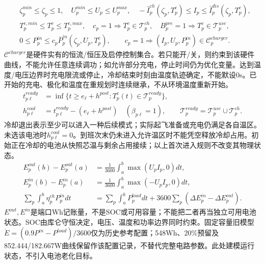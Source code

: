 \begin{align}
 &\zeta^{min}_p\le\zeta_p\le1,\quad U_p^{min}\le U_p\le U_p^{max},
 \quad-\bar I_p^{ch}(\zeta_p,T_p^c)\le I_p\le\bar I_p^{dis}(\zeta_p,T_p^c),\\
 &T_p^{c,min}\le T_p^c\le T_p^{c,max},\quad
 c_p=1\Rightarrow T_p^c\in\mathcal T_p^{ch},\quad
 B_p^{pre}=1\Rightarrow T_p^c\in\mathcal T_p^{use},\\
 &0\le P_p^{in}\le c_p\bar P_p^{in}(\zeta_p,U_p,T_p^c),\qquad
 c_p=1\Rightarrow (I_p,U_p,P_p^{in})\in\mathcal C_p^{charger}.
 \label{eng:eq:chargecurve}
\end{align}
\noindent $\mathcal C^{charger}$是硬件实有的恒流/恒压及启停控制集合。若只能开/关，则约束到该硬件曲线，不能允许任意连续调功；如允许部分充电，停止时间仍为优化变量。达到温度/电压边界时充电限流或停止，冷却结束时刻由温度轨迹确定，不能默设0s。已开始的充电、极化和温度在重规划时连续继承，不从环境温度重新开始。
\begin{align}
 t_{p\ell}^{ready}&=\inf\{t\ge e_\ell+h^{post}:T_p^c(t)\in\mathcal T_p^{ready}\},\\
 h_{p\ell}^{cool}&=t_{p\ell}^{ready}-(e_\ell+h^{post})\quad(\beta_{p\ell}=1),\qquad
 \mathcal T_p^{ready}=\mathcal T_p^{use}\cup\mathcal T_p^{ch}.
 \label{eng:eq:coolingevent}
\end{align}
\noindent 冷却退出表示至少可以进入一种后续模式；实际起飞准备或充电仍满足各自温区。未选该电池时$h_{p\ell}^{cool}=0$。到班次末仍未进入允许温区时不能凭空释放冷却占用。初始正在冷却的电池从快照芯温与剩余占用接续；以上首次进入规则不改变其物理状态。
\begin{align}
 E_p^{out}(b)-E_p^{out}(a)&=\frac1{3600}\int_a^b\max(U_pI_p,0)dt,\\
 E_p^{in}(b)-E_p^{in}(a)&=\frac1{3600}\int_a^b\max(-U_pI_p,0)dt,\\
 \sum_p\int_a^b\eta_p^{ch}P_p^{in}dt
 &=\sum_p\int_a^bP_p^{load}dt
   +3600\sum_p(\Delta E_p^{in}-\Delta E_p^{out}).
 \label{eng:eq:energyledger}
\end{align}
\noindent $E^{out},E^{in}$是端口Wh记账量，不是SOC或可用容量；不能把二者再当独立可用电池状态。SOC由库仑守恒决定，电压、温度和功率边界同时约束。固定容量旧模型$\dot E=(0.9P^{in}-P^{load})/3600$仅为历史参考配置；548Wh、20\%预留及852.444/182.667W曲线保留作该配置记录，不替代完整电路参数。此处建模运行状态，不引入电池老化目标。
\clearpage

